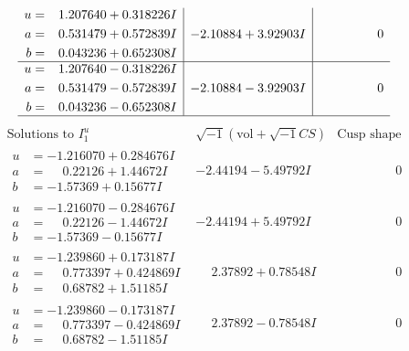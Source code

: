 \documentclass[1p]{elsarticle_modified}
\theoremstyle{definition}
\newcommand{\I}{\sqrt{-1}}
\begin{document}
$$\begin{array}{c|c|c}
\begin{aligned}
u &= \phantom{-}1.207640 + 0.318226 I \\
a &= \phantom{-}0.531479 + 0.572839 I \\
b &= \phantom{-}0.043236 + 0.652308 I\end{aligned}
 & -2.10884 + 3.92903 I & \phantom{-0.000000 } 0 \\ \hline\begin{aligned}
u &= \phantom{-}1.207640 - 0.318226 I \\
a &= \phantom{-}0.531479 - 0.572839 I \\
b &= \phantom{-}0.043236 - 0.652308 I\end{aligned}
 & -2.10884 - 3.92903 I & \phantom{-0.000000 } 0\\
 \hline 
 \end{array}$$\newpage$$\begin{array}{c|c|c}  
\text{Solutions to }I^u_{1}& \I (\text{vol} + \sqrt{-1}CS) & \text{Cusp shape}\\
 \hline 
\begin{aligned}
u &= -1.216070 + 0.284676 I \\
a &= \phantom{-}0.22126 + 1.44672 I \\
b &= -1.57369 + 0.15677 I\end{aligned}
 & -2.44194 - 5.49792 I & \phantom{-0.000000 } 0 \\ \hline\begin{aligned}
u &= -1.216070 - 0.284676 I \\
a &= \phantom{-}0.22126 - 1.44672 I \\
b &= -1.57369 - 0.15677 I\end{aligned}
 & -2.44194 + 5.49792 I & \phantom{-0.000000 } 0 \\ \hline\begin{aligned}
u &= -1.239860 + 0.173187 I \\
a &= \phantom{-}0.773397 + 0.424869 I \\
b &= \phantom{-}0.68782 + 1.51185 I\end{aligned}
 & \phantom{-}2.37892 + 0.78548 I & \phantom{-0.000000 } 0 \\ \hline\begin{aligned}
u &= -1.239860 - 0.173187 I \\
a &= \phantom{-}0.773397 - 0.424869 I \\
b &= \phantom{-}0.68782 - 1.51185 I\end{aligned}
 & \phantom{-}2.37892 - 0.78548 I & \phantom{-0.000000 } 0 \\ \hline\begin{aligned}

\end{aligned}
\end{array}$$
\end{document}

